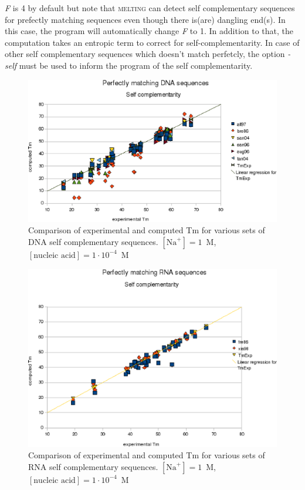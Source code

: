 \documentclass{article}
\begin{document}
\textit{F} is 4 by default but note that \textsc{melting} can detect self complementary sequences 
for prefectly matching sequences even though there is(are) dangling end(s). In this case, the program will 
automatically change \textit{F} to 1. In addition to that, the computation takes an entropic term to correct 
for self-complementarity.
In case of other self complementary sequences which doesn't match perfetcly, the option \textit{-self} must be
used to inform the program of the self complementarity.

\begin{figure}[h]
\includegraphics{images/DNASelfComplementarity.eps}
\caption{Comparison of experimental and computed Tm for various sets of
 DNA self complementary sequences. $[\mbox{Na}^+] = 1$~M, $[\mbox{nucleic acid}] = 1\cdot{}10^{-4}$~M}
\end{figure} 

\begin{figure}[h]
\includegraphics{images/RNASelfComplementarity.eps}
\caption{Comparison of experimental and computed Tm for various sets of
 RNA self complementary sequences. $[\mbox{Na}^+] = 1$~M, $[\mbox{nucleic acid}] = 1\cdot{}10^{-4}$~M}
\end{figure}     
  
\end{document}
